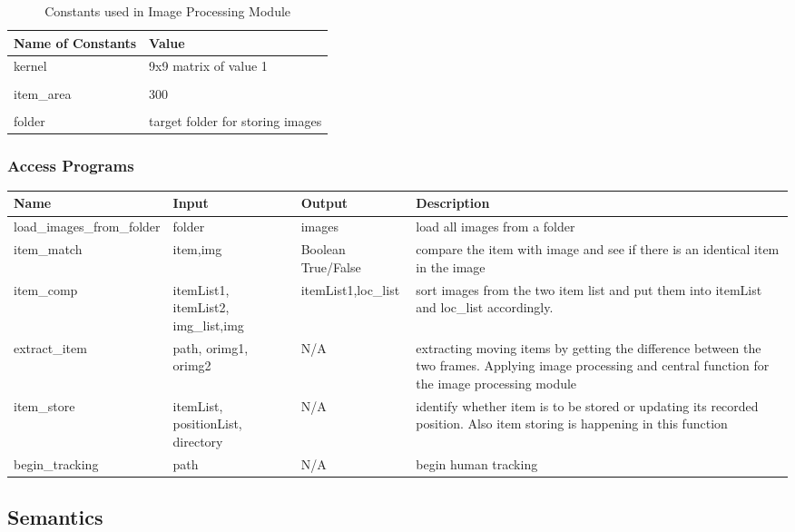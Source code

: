 \documentclass[12pt, titlepage]{article}
\begin{document}
\begin{table}[H]
\caption{Constants used in Image Processing Module} 
\begin{tabularx}{\textwidth}{XX}
\toprule
\textbf{Name of Constants} & \textbf{Value}\\
\midrule
kernel & 9x9 matrix of value 1\\\\
item\_area & 300\\\\
folder & target folder for storing images\\

\bottomrule
\end{tabularx}
\end{table}



\subsubsection{Access Programs}

\begin{center}
\begin{tabular}{|l|p{2cm}|l| p{6cm} |}
\hline
\textbf{Name} & \textbf{Input} & \textbf{Output} & \textbf{Description}  \\
\hline
load\_images\_from\_folder & folder & images & load all images from a folder\\
\hline
item\_match & item,img & Boolean True/False & compare the item with image and see if there is an identical item in the image\\
\hline
item\_comp & itemList1, itemList2, img\_list,img & itemList1,loc\_list & sort images from the two item list and put them into itemList and loc\_list accordingly.\\
\hline
extract\_item & path, orimg1, orimg2 & N/A & extracting moving items by getting the difference between the two frames. Applying image processing and central function for the image processing module \\
\hline
item\_store & itemList, positionList, directory & N/A & identify whether item is to be stored or updating its recorded position. Also item storing is happening in this function \\
\hline
begin\_tracking & path & N/A & begin human tracking  \\
\hline
\end{tabular}
\end{center}

\subsection{Semantics}
\end{document}
